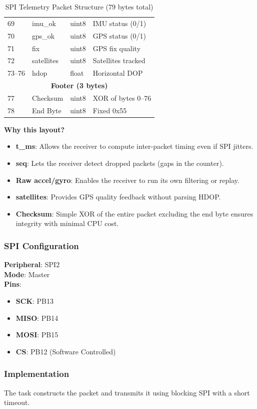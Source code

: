 \documentclass[11pt,a4paper]{article}
\begin{document}
\begin{table}[H]
\begin{tabular}{@{}llll@{}}
\midrule
69 & imu\_ok & uint8 & IMU status (0/1) \\
70 & gps\_ok & uint8 & GPS status (0/1) \\
71 & fix & uint8 & GPS fix quality \\
72 & satellites & uint8 & Satellites tracked \\
73--76 & hdop & float & Horizontal DOP \\
\midrule
\multicolumn{4}{c}{\textbf{Footer (3 bytes)}} \\
\midrule
77 & Checksum & uint8 & XOR of bytes 0--76 \\
78 & End Byte & uint8 & Fixed 0x55 \\
\bottomrule
\end{tabular}
\caption{SPI Telemetry Packet Structure (79 bytes total)}
\end{table}

\textbf{Why this layout?}
\begin{itemize}
    \item \textbf{t\_ms}: Allows the receiver to compute inter-packet timing even if SPI jitters.
    \item \textbf{seq}: Lets the receiver detect dropped packets (gaps in the counter).
    \item \textbf{Raw accel/gyro}: Enables the receiver to run its own filtering or replay.
    \item \textbf{satellites}: Provides GPS quality feedback without parsing HDOP.
    \item \textbf{Checksum}: Simple XOR of the entire packet excluding the end byte ensures integrity with minimal CPU cost.
\end{itemize}

\subsubsection{SPI Configuration}
\textbf{Peripheral}: SPI2 \\
\textbf{Mode}: Master \\
\textbf{Pins}:
\begin{itemize}
    \item \textbf{SCK}: PB13
    \item \textbf{MISO}: PB14
    \item \textbf{MOSI}: PB15
    \item \textbf{CS}: PB12 (Software Controlled)
\end{itemize}

\subsubsection{Implementation}
The task constructs the packet and transmits it using blocking SPI with a short timeout.
\end{document}
